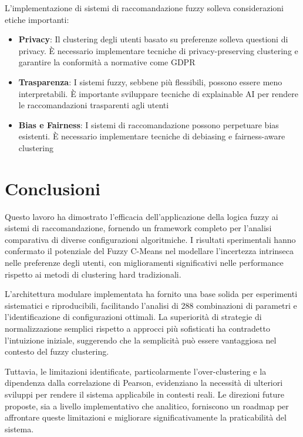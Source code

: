 L'implementazione di sistemi di raccomandazione fuzzy solleva considerazioni etiche importanti:

\begin{itemize}
    \item \textbf{Privacy}: Il clustering degli utenti basato su preferenze solleva questioni di privacy. È necessario implementare tecniche di privacy-preserving clustering e garantire la conformità a normative come GDPR
    
    \item \textbf{Trasparenza}: I sistemi fuzzy, sebbene più flessibili, possono essere meno interpretabili. È importante sviluppare tecniche di explainable AI per rendere le raccomandazioni trasparenti agli utenti
    
    \item \textbf{Bias e Fairness}: I sistemi di raccomandazione possono perpetuare bias esistenti. È necessario implementare tecniche di debiasing e fairness-aware clustering
\end{itemize}

\section{Conclusioni}

Questo lavoro ha dimostrato l'efficacia dell'applicazione della logica fuzzy ai sistemi di raccomandazione, fornendo un framework completo per l'analisi comparativa di diverse configurazioni algoritmiche. I risultati sperimentali hanno confermato il potenziale del Fuzzy C-Means nel modellare l'incertezza intrinseca nelle preferenze degli utenti, con miglioramenti significativi nelle performance rispetto ai metodi di clustering hard tradizionali.

L'architettura modulare implementata ha fornito una base solida per esperimenti sistematici e riproducibili, facilitando l'analisi di 288 combinazioni di parametri e l'identificazione di configurazioni ottimali. La superiorità di strategie di normalizzazione semplici rispetto a approcci più sofisticati ha contradetto l'intuizione iniziale, suggerendo che la semplicità può essere vantaggiosa nel contesto del fuzzy clustering.

Tuttavia, le limitazioni identificate, particolarmente l'over-clustering e la dipendenza dalla correlazione di Pearson, evidenziano la necessità di ulteriori sviluppi per rendere il sistema applicabile in contesti reali. Le direzioni future proposte, sia a livello implementativo che analitico, forniscono un roadmap per affrontare queste limitazioni e migliorare significativamente la praticabilità del sistema.

